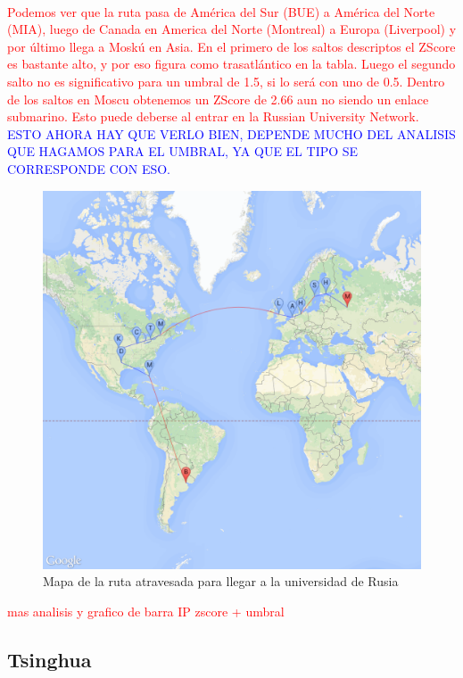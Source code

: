 ~

\textcolor{red}{Podemos ver que la ruta pasa de Am\'erica del Sur (BUE) a Am\'erica del Norte (MIA), luego de Canada en America del Norte (Montreal) a Europa (Liverpool) y por \'ultimo llega a Mosk\'u en Asia. En el primero de los saltos descriptos el ZScore es bastante alto, y por eso figura como trasatl\'antico en la tabla.
Luego el segundo salto no es significativo para un umbral de 1.5, si lo ser\'a con uno de 0.5.
Dentro de los saltos en Moscu obtenemos un ZScore de 2.66 aun no siendo un enlace submarino. Esto puede deberse al entrar en la Russian University Network.}
\textcolor{blue}{ESTO AHORA HAY QUE VERLO BIEN, DEPENDE MUCHO DEL ANALISIS QUE HAGAMOS PARA EL UMBRAL, YA QUE EL TIPO SE CORRESPONDE CON ESO.}

\begin{figure}[H]
	\begin{center}
		  \includegraphics[scale=0.25]{../results/maps/MSU.png}
		  \caption{Mapa de la ruta atravesada para llegar a la universidad de Rusia}
	\end{center}
\end{figure}

\textcolor{red}{mas analisis y grafico de barra IP zscore + umbral}

\subsection{Tsinghua}

